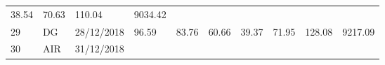 \documentclass[
  11pt,
]{article}
\begin{document}
\begin{longtable}[]{@{}llllllllll@{}}
\begin{minipage}[t]{0.06\columnwidth}
38.54\strut
\end{minipage} & \begin{minipage}[t]{0.06\columnwidth}\raggedright
70.63\strut
\end{minipage} & \begin{minipage}[t]{0.13\columnwidth}\raggedright
110.04\strut
\end{minipage} & \begin{minipage}[t]{0.08\columnwidth}\raggedright
9034.42\strut
\end{minipage}\tabularnewline
\begin{minipage}[t]{0.04\columnwidth}\raggedright
29\strut
\end{minipage} & \begin{minipage}[t]{0.09\columnwidth}\raggedright
DG\strut
\end{minipage} & \begin{minipage}[t]{0.10\columnwidth}\raggedright
28/12/2018\strut
\end{minipage} & \begin{minipage}[t]{0.06\columnwidth}\raggedright
96.59\strut
\end{minipage} & \begin{minipage}[t]{0.06\columnwidth}\raggedright
83.76\strut
\end{minipage} & \begin{minipage}[t]{0.06\columnwidth}\raggedright
60.66\strut
\end{minipage} & \begin{minipage}[t]{0.06\columnwidth}\raggedright
39.37\strut
\end{minipage} & \begin{minipage}[t]{0.06\columnwidth}\raggedright
71.95\strut
\end{minipage} & \begin{minipage}[t]{0.13\columnwidth}\raggedright
128.08\strut
\end{minipage} & \begin{minipage}[t]{0.08\columnwidth}\raggedright
9217.09\strut
\end{minipage}\tabularnewline
\begin{minipage}[t]{0.04\columnwidth}\raggedright
30\strut
\end{minipage} & \begin{minipage}[t]{0.09\columnwidth}\raggedright
AIR\strut
\end{minipage} & \begin{minipage}[t]{0.10\columnwidth}\raggedright
31/12/2018\strut
\end{minipage} & \begin{minipage}[t]{0.06\columnwidth}\raggedright

\end{minipage}
\end{longtable}
\end{document}
